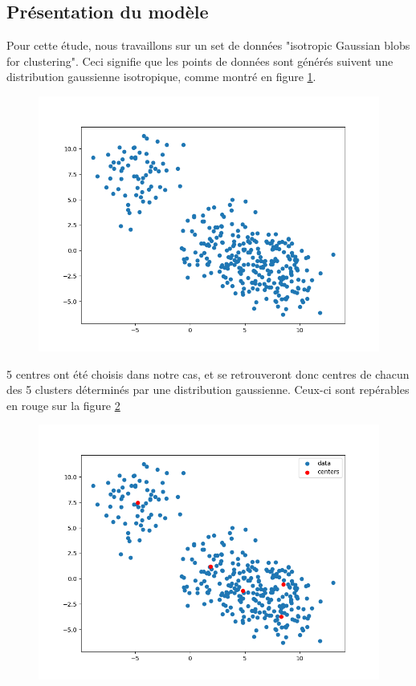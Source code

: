 \documentclass[french,a4paper,18pt]{article}
\begin{document}
\subsection{Présentation du modèle}
Pour cette étude, nous travaillons sur un set de données "isotropic Gaussian blobs for clustering". Ceci signifie que les points de données sont générés suivent une distribution gaussienne isotropique, comme montré en figure \ref{fig:gmm_generate_data}.

\begin{figure}[h!]
    \centering
    \includegraphics[scale=0.4]{images/gmm_generate_data.png}
    \caption{}\label{fig:gmm_generate_data}
\end{figure}

5 centres ont été choisis dans notre cas, et se retrouveront donc centres de chacun des 5 clusters déterminés par une distribution gaussienne. Ceux-ci sont repérables en rouge sur la figure \ref{fig:gmm_centers}

\begin{figure}[h!]
    \centering
    \includegraphics[scale=0.4]{images/gmm_centers.png}
    \caption{}\label{fig:gmm_centers}
\end{figure}
\end{document}
